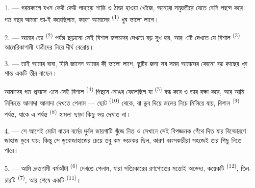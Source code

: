 %

\VUsaut{4.0mm}
\VUsaut{3.0mm}
\VUsaut{3.0mm}

1. --- গরমকালে যখন কেউ কেউ পাহাড়ে শান্তি ও ঠান্ডা হাওয়া খোঁজে, অন্যেরা
সমুদ্রতীরে যেতে বেশি পছন্দ করে। গত বছর আমরা তা-ই করেছিলাম, কারণ আমাদের
 \textsuperscript{(1)} খুব ভালো লাগে।

2. --- আমার তো  \textsuperscript{(2)} পর্যন্ত ছড়ানো সেই বিশাল
জলচাদর দেখতে বড় সুখ হয়, আর এটি দেখতে যে বিশাল 
\textsuperscript{(3)} আমেরিকাগামী যাত্রীদের নিয়ে দীর্ঘ 
বেরোয়।

3. --- তাই আমার বাবা, যিনি জানেন আমার কী ভালো লাগে, ছুটির জন্য সব সময় আমাদের
কোনো বড়  কাছের খুব শান্ত একটি তীর বাছেন।

আমাদের গত প্রবাসে  এসে সেই বিশাল 
\textsuperscript{(4)} পিছনে নোঙর ফেলেছিল যা 
\textsuperscript{(5)} বন্ধ করে ও তার রক্ষা করে, আর আমি নিশ্চিন্তে আলাদা আলাদা
 দেখতে পেলাম --- ছোট  \textsuperscript{(10)}
থেকে, যা ডুব দিয়ে জলের নিচে মিলিয়ে যায়, বিশাল 
\textsuperscript{(9)} পর্যন্ত, যাকে এ পর্যন্ত 
\textsuperscript{(8)} হামলা ছাড়া কিছু ভয় দেখাত না।

\VUsaut{3.0mm}
\VUsaut{3.0mm}

4. --- সে আগেই  মোটা ধাতব বর্মের দুর্বল জায়গাটি খুঁজে নিত ও
সেখানে সেই বিপজ্জনক  গেঁথে দিত যার বিস্ফোরণে জাহাজ ডুবে যায়;
কিন্তু সে ডুবোজাহাজের চেয়ে তবু কম ভয়ংকর ছিল, কারণ ধ্বংসকারীরা সহজেই তার পিছু
নিতে পারে।

5. --- আমি দ্রুতগামী বর্মআঁটা  \textsuperscript{(6)} দেখতে
পেলাম, যারা সত্যিকারের রণপোতের মতোই অভেদ্য, কয়েকটি 
\textsuperscript{(12)}, তিন-চারটি  \textsuperscript{(7)}, আর
শেষে একটি  \textsuperscript{(11)}। 

